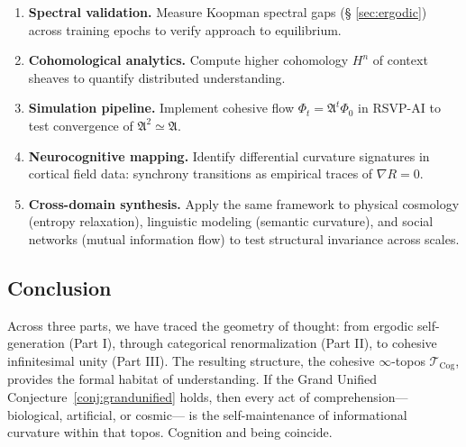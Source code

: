 \documentclass[12pt,a4paper,twoside,openright]{book}
\begin{document}
\begin{enumerate}
\item \textbf{Spectral validation.}
  Measure Koopman spectral gaps (§ \ref{sec:ergodic})
  across training epochs to verify approach to equilibrium.
\item \textbf{Cohomological analytics.}
  Compute higher cohomology $H^n$ of context sheaves
  to quantify distributed understanding.
\item \textbf{Simulation pipeline.}
  Implement cohesive flow $\Phi_t=\mathfrak{A}^t\Phi_0$
  in RSVP-AI to test convergence of $\mathfrak{A}^2\simeq\mathfrak{A}$.
\item \textbf{Neurocognitive mapping.}
  Identify differential curvature signatures in cortical field data:
  synchrony transitions as empirical traces of $\nabla R=0$.
\item \textbf{Cross-domain synthesis.}
  Apply the same framework to physical cosmology (entropy relaxation),
  linguistic modeling (semantic curvature),
  and social networks (mutual information flow)
  to test structural invariance across scales.
\end{enumerate}

\subsection*{Conclusion}

Across three parts, we have traced the geometry of thought:
from ergodic self-generation (Part I),
through categorical renormalization (Part II),
to cohesive infinitesimal unity (Part III).
The resulting structure, the cohesive $\infty$-topos $\mathcal{T}_{\mathrm{Cog}}$,
provides the formal habitat of understanding.
If the Grand Unified Conjecture~\ref{conj:grandunified} holds,
then every act of comprehension—biological, artificial, or cosmic—
is the self-maintenance of informational curvature within that topos.
Cognition and being coincide.
\end{document}

